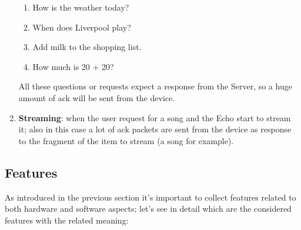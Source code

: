 \documentclass[sigconf]{acmart}
\begin{document}
\begin{enumerate}
\begin{enumerate}
            \item How is the weather today?
            \item When does Liverpool play?
            \item Add milk to the shopping list.
            \item How much is 20 + 20?
        \end{enumerate}
        All these questions or requests expect a response from the Server, so a huge amount of ack will be sent from the device.
        \item \textbf{Streaming}: when the user request for a song and the Echo start to stream it; also in this case a lot of ack packets are sent from the device as response to the fragment of the item to stream (a song for example).
    \end{enumerate}
	\subsection{Features}
    As introduced in the previous section it's important to collect features related to both hardware and software aspects; let's see in detail which are the considered features with the related meaning:
\end{document}
